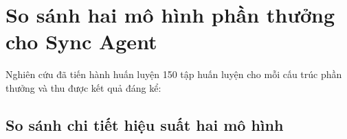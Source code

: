 





\section{So sánh hai mô hình phần thưởng cho Sync Agent}

Nghiên cứu đã tiến hành huấn luyện 150 tập huấn luyện cho mỗi cấu trúc phần thưởng và thu được kết quả đáng kể:

\subsection{So sánh chi tiết hiệu suất hai mô hình}

